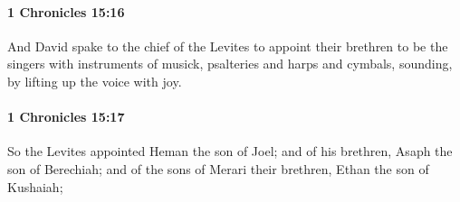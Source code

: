 		\paragraph{1 Chronicles 15:16} %
			\label{1CHRONICLES-15-16}

			And David spake to the chief of the Levites to appoint their brethren to be the singers with instruments of musick, psalteries and harps and cymbals, sounding, by lifting up the voice with joy.


		\paragraph{1 Chronicles 15:17} %
			\label{1CHRONICLES-15-17}

			So the Levites appointed Heman the son of Joel; and of his brethren, Asaph the son of Berechiah; and of the sons of Merari their brethren, Ethan the son of Kushaiah;

